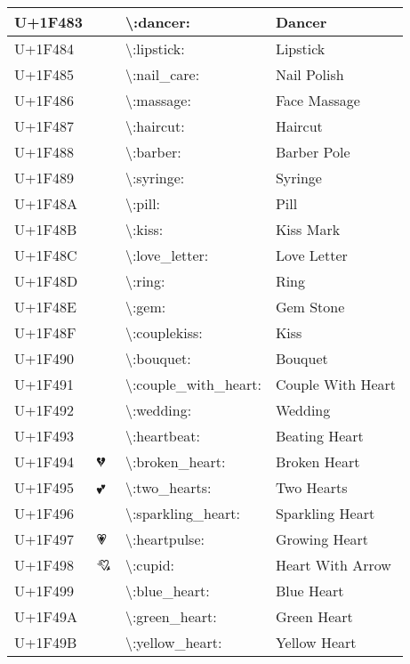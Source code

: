 \begin{table}[h]
\begin{tabulary}{\linewidth}{|L|L|L|L|}
U+1F483 & 💃 & {\textbackslash}:dancer: & Dancer \\
\hline
U+1F484 & 💄 & {\textbackslash}:lipstick: & Lipstick \\
\hline
U+1F485 & 💅 & {\textbackslash}:nail\_care: & Nail Polish \\
\hline
U+1F486 & 💆 & {\textbackslash}:massage: & Face Massage \\
\hline
U+1F487 & 💇 & {\textbackslash}:haircut: & Haircut \\
\hline
U+1F488 & 💈 & {\textbackslash}:barber: & Barber Pole \\
\hline
U+1F489 & 💉 & {\textbackslash}:syringe: & Syringe \\
\hline
U+1F48A & 💊 & {\textbackslash}:pill: & Pill \\
\hline
U+1F48B & 💋 & {\textbackslash}:kiss: & Kiss Mark \\
\hline
U+1F48C & 💌 & {\textbackslash}:love\_letter: & Love Letter \\
\hline
U+1F48D & 💍 & {\textbackslash}:ring: & Ring \\
\hline
U+1F48E & 💎 & {\textbackslash}:gem: & Gem Stone \\
\hline
U+1F48F & 💏 & {\textbackslash}:couplekiss: & Kiss \\
\hline
U+1F490 & 💐 & {\textbackslash}:bouquet: & Bouquet \\
\hline
U+1F491 & 💑 & {\textbackslash}:couple\_with\_heart: & Couple With Heart \\
\hline
U+1F492 & 💒 & {\textbackslash}:wedding: & Wedding \\
\hline
U+1F493 & 💓 & {\textbackslash}:heartbeat: & Beating Heart \\
\hline
U+1F494 & 💔 & {\textbackslash}:broken\_heart: & Broken Heart \\
\hline
U+1F495 & 💕 & {\textbackslash}:two\_hearts: & Two Hearts \\
\hline
U+1F496 & 💖 & {\textbackslash}:sparkling\_heart: & Sparkling Heart \\
\hline
U+1F497 & 💗 & {\textbackslash}:heartpulse: & Growing Heart \\
\hline
U+1F498 & 💘 & {\textbackslash}:cupid: & Heart With Arrow \\
\hline
U+1F499 & 💙 & {\textbackslash}:blue\_heart: & Blue Heart \\
\hline
U+1F49A & 💚 & {\textbackslash}:green\_heart: & Green Heart \\
\hline
U+1F49B & 💛 & {\textbackslash}:yellow\_heart: & Yellow Heart \\

\end{tabulary}
\end{table}

